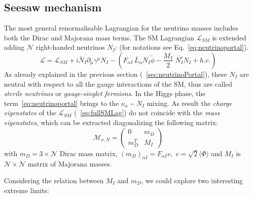 \subsection{Seesaw mechanism}\label{sec:seesaw}
The most general renormalisable Lagrangian for the neutrino masses includes both the Dirac and Majorana mass terms. The SM Lagrangian $\mathcal{L}_{SM}$ is extended adding $\mathcal{N}$ right-handed neutrinos $N_I$: (for notations see Eq.~\ref{eq:neutrinoportal}).
\begin{equation}
\label{eq:fullSMLag}
 \mathcal{L} = \mathcal{L}_{SM}+ i \bar N_I \partial_\mu \gamma^\mu N_I -
  \left(F_{\alpha I} \,\bar L_\alpha N_I \tilde \phi 
    - \frac{M_I}{2} \; \bar {N_I^c} N_I + h.c.\right)
\end{equation}
As already explained in the previous section (~\ref{sec:neutrinoPortal}), these $N_I$ are neutral with respect to all the gauge interactions of the SM, thus are called \emph{sterile neutrinos} or \emph{gauge-singlet fermions}.
In the Higgs phase, the term~\ref{eq:neutrinoportal} brings to the $\nu_{\alpha} - N_I$ mixing. As result the \emph{charge eigenstates} of the $\mathcal{L}_{SM}$ (~\ref{eq:fullSMLag}) do not coincide with the \emph{mass eigenstates}, which can be extracted diagonalizing the following matrix:
\begin{equation}
\label{eq:matrixmass}
 \mathcal{M}_{\nu,N} = 
\begin{pmatrix}
0 & m_D\\
m^{T}_{D} & M_I
\end{pmatrix}
\end{equation}
with $m_D = 3 \times  \mathcal{N}$ Dirac mass matrix, $(m_D)_{\alpha I} = F_{\alpha I}v, \; v = \sqrt{2}\langle \Phi \rangle$ and $M_I$ is $\mathcal{N} \times \mathcal{N}$ matrix of Majorana masses.

Considering the relation between $M_I$ and $m_D$, we could explore two interesting extreme limits:
